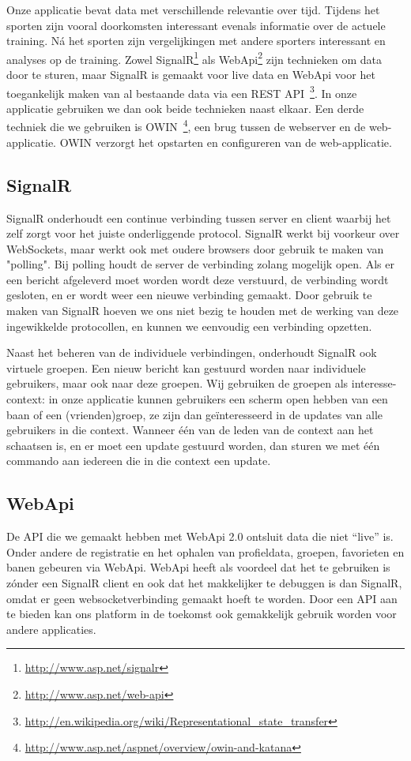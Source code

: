 Onze applicatie bevat data met verschillende relevantie over tijd. Tijdens het sporten zijn vooral doorkomsten interessant evenals informatie over de actuele training. Ná het sporten zijn vergelijkingen met andere sporters interessant en analyses op de training. Zowel SignalR\footnote{\url{http://www.asp.net/signalr}} als WebApi\footnote{\url{http://www.asp.net/web-api}} zijn technieken om data door te sturen, maar SignalR is gemaakt voor live data en WebApi voor het toegankelijk maken van al bestaande data via een REST API~\footnote{\url{http://en.wikipedia.org/wiki/Representational_state_transfer}}. In onze applicatie gebruiken we dan ook beide technieken naast elkaar. Een derde techniek die we gebruiken is OWIN~\footnote{\url{http://www.asp.net/aspnet/overview/owin-and-katana}}, een brug tussen de webserver en de web-applicatie. OWIN verzorgt het opstarten en configureren van de web-applicatie.

\subsection{SignalR}
SignalR onderhoudt een continue verbinding tussen server en client waarbij het zelf zorgt voor het juiste onderliggende protocol. SignalR werkt bij voorkeur over WebSockets, maar werkt ook met oudere browsers door gebruik te maken van "polling". Bij polling houdt de server de verbinding zolang mogelijk open. Als er een bericht afgeleverd moet worden wordt deze verstuurd, de verbinding wordt gesloten, en er wordt weer een nieuwe verbinding gemaakt. Door gebruik te maken van SignalR hoeven we ons niet bezig te houden met de werking van deze ingewikkelde protocollen, en kunnen we eenvoudig een verbinding opzetten.

Naast het beheren van de individuele verbindingen, onderhoudt SignalR ook virtuele groepen. Een nieuw bericht kan gestuurd worden naar individuele gebruikers, maar ook naar deze groepen. Wij gebruiken de groepen als interesse-context: in onze applicatie kunnen gebruikers een scherm open hebben van een baan of een (vrienden)groep, ze zijn dan geïnteresseerd in de updates van alle gebruikers in die context. Wanneer één van de leden van de context aan het schaatsen is, en er moet een update gestuurd worden, dan sturen we met één commando aan iedereen die in die context een update.

\subsection{WebApi}
De API die we gemaakt hebben met WebApi 2.0 ontsluit data die niet ``live'' is. Onder andere de registratie en het ophalen van profieldata, groepen, favorieten en banen gebeuren via WebApi. WebApi heeft als voordeel dat het te gebruiken is zónder een SignalR client en ook dat het makkelijker te debuggen is dan SignalR, omdat er geen  websocketverbinding gemaakt hoeft te worden. Door een API aan te bieden kan ons platform in de toekomst ook gemakkelijk gebruik worden voor andere applicaties.

